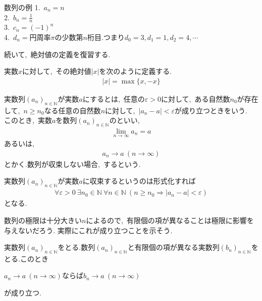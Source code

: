 \documentclass[hyperref,a4paper,12pt]{kininaruki}
\begin{document}
\begin{itembox}[l]{数列の例}
    1.\, $a_{n} = n$\\
    2.\, $b_{n} = \frac{1}{n}$\\
    3.\, $c_{n} = (-1)^{n}$\\
    4.\, $d_{n} = $円周率$\pi$の少数第$n$桁目.つまり$d_{0} = 3,d_{1} = 1,d_{2} = 4,\cdots$
\end{itembox}
続いて,\, 絶対値の定義を復習する.
\begin{shadebox}
    実数$x$に対して,\, その絶対値$|x|$を次のように定義する.
    \begin{align}
        |x| = \max\{x,-x\}
    \end{align}
\end{shadebox}

\begin{shadebox}
    実数列$(a_{n})_{n\in \mathbb{N}}$が実数$a$にするとは,\, 任意の$\varepsilon > 0$に対して,\, 
    ある自然数$n_{0}$が存在して,\, $n\geq n_{0}$なる任意の自然数$n$に対して,\, 
    $|a_{n} - a| < \varepsilon$が成り立つときをいう.\\
    このとき,\, 実数$a$を数列$(a_{n})_{n\in \mathbb{N}}$のといい,\,
    \begin{align}
        \lim_{n\to \infty}a_{n} = a
    \end{align}
    あるいは,
    \begin{align}
        a_{n}\to a\ (n\to \infty)
    \end{align}
    とかく.数列が収束しない場合,\, するという.
    \begin{boxnote}
        実数列$(a_{n})_{n\in \mathbb{N}}$が実数$a$に収束するというのは形式化すれば
        \begin{align}
            \forall \varepsilon > 0\ \exists n_{0}\in \mathbb{N}\ \forall n\in \mathbb{N}\ (n\geq n_{0}\Rightarrow |a_{n} - a| < \varepsilon)
        \end{align}
        となる.
    \end{boxnote}
\end{shadebox}
数列の極限は十分大きい$n$によるので,\, 有限個の項が異なることは極限に影響を与えないだろう.
実際にこれが成り立つことを示そう.

実数列$(a_{n})_{n\in \mathbb{N}}$をとる.数列$(a_{n})_{n\in \mathbb{N}}$と有限個の項が異なる実数列$(b_{n})_{n\in \mathbb{N}}$をとる.このとき
\begin{center}
    $a_{n} \to a\ (n\to \infty)$ならば$b_{n} \to a\ (n\to \infty)$
\end{center}
が成り立つ.\\
\end{document}
